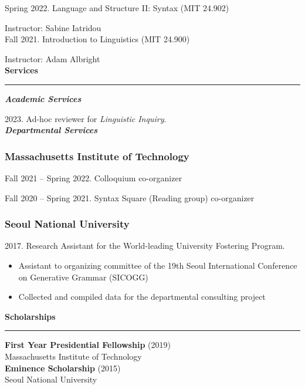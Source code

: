 \documentclass[11pt]{article}
\newcommand{\sect}[1]{{\fontsize{15}{25}\selectfont \textbf{#1}} {\vspace{0.1cm}} \hrule {\vspace{0.3cm}}}
\newcommand{\subsect}[1]{{\fontsize{12}{18}\selectfont \textit{\textbf{#1}}} {\vspace{0.3cm}}}
\begin{document}
{Spring 2022. Language and Structure II: Syntax (MIT 24.902)

{\hphantom{Spring 2022.}} Instructor: Sabine Iatridou\\

Fall 2021. Introduction to Linguistics (MIT 24.900)

{\hphantom{Fall 2021.}} Instructor: Adam Albright\\

\sect{Services}

\subsect{Academic Services}

2023. Ad-hoc reviewer for {\textit{Linguistic Inquiry}}.\\


\subsect{Departmental Services}

\vspace{-0.75cm}

\subsubsection*{Massachusetts Institute of Technology}
Fall 2021 -- Spring 2022. Colloquium co-organizer

Fall 2020 -- Spring 2021. Syntax Square (Reading group) co-organizer

\subsubsection*{Seoul National University}
{2017. Research Assistant for the World-leading University Fostering Program.

\begin{itemize}[leftmargin=15pt, topsep=0pt, itemsep=0pt, parsep=0pt]
	\item{{\small Assistant to organizing committee of the 19th Seoul International Conference on Generative Grammar (SICOGG)}}
	\item{{\small Collected and compiled data for the departmental consulting project}}
\end{itemize}
}

\vspace{1cm}

\sect{Scholarships}

\textbf{First Year Presidential Fellowship} (2019)\\{Massachusetts Institute of Technology}\\

{\textbf{Eminence Scholarship}} (2015)\\{Seoul National University}\\

}
\end{document}
